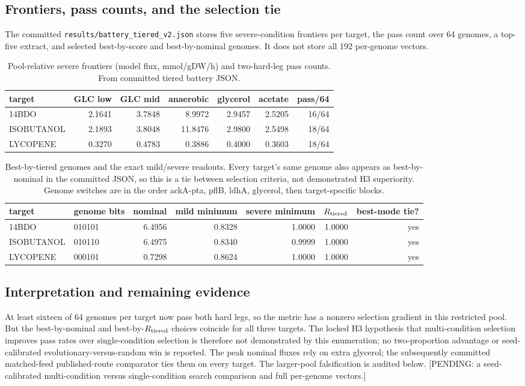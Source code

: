 \subsection{Frontiers, pass counts, and the selection tie}
The committed \texttt{results/battery\_tiered\_v2.json} stores five severe-condition frontiers per target, the pass count over 64 genomes, a top-five extract, and selected best-by-score and best-by-nominal genomes. It does not store all 192 per-genome vectors.\begin{table}[!htbp]\centering\small\caption{Pool-relative severe frontiers (model flux, mmol/gDW/h) and two-hard-leg pass counts. From committed tiered battery JSON.}\begin{tabular}{lrrrrrr}\hline target & GLC low & GLC mid & anaerobic & glycerol & acetate & pass/64 \\\hline
14BDO & 2.1641 & 3.7848 & 8.9972 & 2.9457 & 2.5205 & 16/64 \\
ISOBUTANOL & 2.1893 & 3.8048 & 11.8476 & 2.9800 & 2.5498 & 18/64 \\
LYCOPENE & 0.3270 & 0.4783 & 0.3886 & 0.4000 & 0.3603 & 18/64 \\
\hline\end{tabular}\end{table}
\begin{table}[!htbp]\centering\small\caption{Best-by-tiered genomes and the exact mild/severe readouts. Every target's same genome also appears as best-by-nominal in the committed JSON, so this is a tie between selection criteria, not demonstrated H3 superiority. Genome switches are in the order ackA-pta, pflB, ldhA, glycerol, then target-specific blocks.}\begin{tabular}{lp{3.1cm}rrrrr}\hline target & genome bits & nominal & mild minimum & severe minimum & $R_{\rm tiered}$ & best-mode tie? \\\hline
14BDO & 010101 & 6.4956 & 0.8328 & 1.0000 & 1.0000 & yes\\
ISOBUTANOL & 010110 & 6.4975 & 0.8340 & 0.9999 & 1.0000 & yes\\
LYCOPENE & 000101 & 0.7298 & 0.8624 & 1.0000 & 1.0000 & yes\\
\hline\end{tabular}\end{table}
\subsection{Interpretation and remaining evidence}
At least sixteen of 64 genomes per target now pass both hard legs, so the metric has a nonzero selection gradient in this restricted pool. But the best-by-nominal and best-by-$R_{\rm tiered}$ choices coincide for all three targets. The locked H3 hypothesis that multi-condition selection improves pass rates over single-condition selection is therefore not demonstrated by this enumeration; no two-proportion advantage or seed-calibrated evolutionary-versus-random win is reported. The peak nominal fluxes rely on extra glycerol; the subsequently committed matched-feed published-route comparator ties them on every target. The larger-pool falsification is audited below. [PENDING: a seed-calibrated multi-condition versus single-condition search comparison and full per-genome vectors.]


